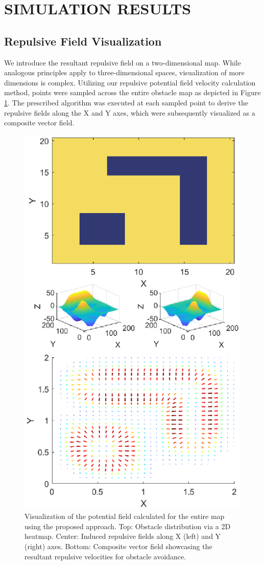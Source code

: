 \documentclass[letterpaper, 10 pt, conference]{ieeeconf}  %
\begin{document}
\section{SIMULATION RESULTS}

\subsection{Repulsive Field Visualization}

We introduce the resultant repulsive field on a two-dimensional map. While analogous principles apply to three-dimensional spaces, visualization of more dimensions is complex. Utilizing our repulsive potential field velocity calculation method, points were sampled across the entire obstacle map as depicted in Figure \ref{fig:example-field}. The prescribed algorithm was executed at each sampled point to derive the repulsive fields along the X and Y axes, which were subsequently visualized as a composite vector field.

\begin{figure}
	\centering
	\includegraphics[width=0.8\linewidth]{demo-field1c.eps} %
	\caption{Visualization of the potential field calculated for the entire map using the proposed approach. Top: Obstacle distribution via a 2D heatmap. Center: Induced repulsive fields along X (left) and Y (right) axes. Bottom: Composite vector field showcasing the resultant repulsive velocities for obstacle avoidance.}
	\label{fig:example-field}
\end{figure}
\end{document}
